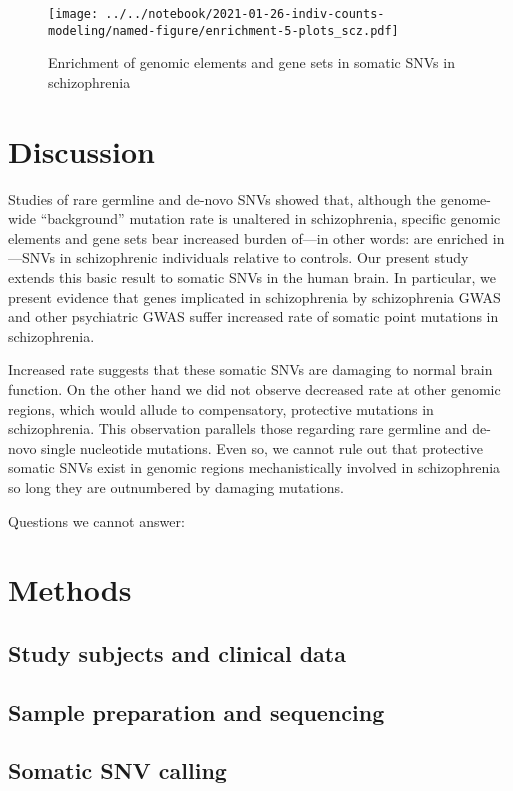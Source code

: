 \documentclass[letterpaper]{article}
\begin{document}
\begin{figure}
\texttt{[image: ../../notebook/2021-01-26-indiv-counts-modeling/named-figure/enrichment-5-plots\_scz.pdf]}
\caption{Enrichment of genomic elements and gene sets in somatic SNVs in schizophrenia}
\label{fig:testresults}
\end{figure}

\section*{Discussion}

Studies of rare germline and de-novo SNVs showed that, although the
genome-wide ``background'' mutation rate is unaltered in schizophrenia,
specific genomic elements and gene sets bear increased burden of---in other
words: are enriched in---SNVs in schizophrenic individuals relative to
controls.  Our present study extends this basic result to somatic SNVs in the
human brain.  In particular, we present evidence that genes implicated in
schizophrenia by schizophrenia GWAS and other psychiatric GWAS suffer
increased rate of somatic point mutations in schizophrenia.

Increased rate suggests that these somatic SNVs are damaging to normal brain
function.  On the other hand we did not observe decreased rate at other
genomic regions, which would allude to compensatory, protective mutations in
schizophrenia.  This observation parallels those regarding rare germline and
de-novo single nucleotide mutations.  Even so, we cannot rule out that
protective somatic SNVs exist in genomic regions mechanistically involved in
schizophrenia so long they are outnumbered by damaging mutations.

Questions we cannot answer:

\section*{Methods}

\subsection{Study subjects and clinical data}

\subsection{Sample preparation and sequencing}

\subsection{Somatic SNV calling}
\end{document}
